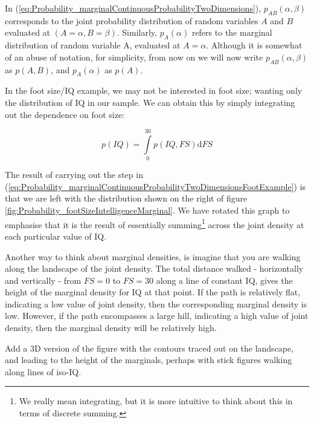 \documentclass[11pt,fullpage]{book}
\begin{document}
In (\ref{eq:Probability_marginalContinuousProbabilityTwoDimensions}), $p_{AB}(\alpha,\beta)$ corresponds to the joint probability distribution of random variables $A$ and $B$ evaluated at $(A=\alpha,B=\beta)$. Similarly, $p_A(\alpha)$ refers to the marginal distribution of random variable A, evaluated at $A=\alpha$. Although it is somewhat of an abuse of notation, for simplicity, from now on we will now write $p_{AB}(\alpha,\beta)$ as $p(A,B)$, and $p_A(\alpha)$ as $p(A)$.

In the foot size/IQ example, we may not be interested in foot size; wanting only the distribution of IQ in our sample. We can obtain this by simply integrating out the dependence on foot size:

\begin{equation}\label{eq:Probability_marginalContinuousProbabilityTwoDimensionsFootExample}
p(IQ) = \int\limits_{0}^{30} p(IQ,FS) \mathrm{d}FS
\end{equation}

The result of carrying out the step in (\ref{eq:Probability_marginalContinuousProbabilityTwoDimensionsFootExample}) is that we are left with the distribution shown on the right of figure \ref{fig:Probability_footSizeIntelligenceMarginal}. We have rotated this graph to emphasise that it is the result of essentially summing\footnote{We really mean integrating, but it is more intuitive to think about this in terms of discrete summing.} across the joint density at each particular value of IQ. 

Another way to think about marginal densities, is imagine that you are walking along the landscape of the joint density. The total distance walked - horizontally and vertically - from $FS=0$ to $FS=30$ along a line of constant IQ, gives the height of the marginal density for IQ at that point. If the path is relatively flat, indicating a low value of joint density, then the corresponding marginal density is low. However, if the path encompasses a large hill, indicating a high value of joint density, then the marginal density will be relatively high.

Add a 3D version of the figure with the contours traced out on the landscape, and leading to the height of the marginals, perhaps with stick figures walking along lines of iso-IQ.
\end{document}
